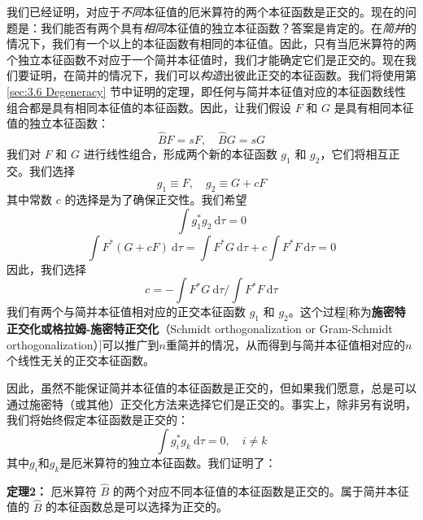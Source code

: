     我们已经证明，对应于\textit{不同}本征值的厄米算符的两个本征函数是正交的。现在的问题是：我们能否有两个具有\textit{相同}本征值的独立本征函数？答案是肯定的。在\textit{简并}的情况下，我们有一个以上的本征函数有相同的本征值。因此，只有当厄米算符的两个独立本征函数不对应于一个简并本征值时，我们才能确定它们是正交的。现在我们要证明，在简并的情况下，我们可以\textit{构造}出彼此正交的本征函数。我们将使用第 \ref{sec:3.6 Degeneracy} 节中证明的定理，即任何与简并本征值对应的本征函数线性组合都是具有相同本征值的本征函数。因此，让我们假设 $F$ 和 $G$ 是具有相同本征值的独立本征函数：
    \begin{equation*}
        \hat{B}F = sF, \quad \hat{B}G = sG
    \end{equation*}
    我们对 $F$ 和 $G$ 进行线性组合，形成两个新的本征函数 $g_1$ 和 $g_2$，它们将相互正交。我们选择
    \begin{equation*}
        g_1 \equiv F, \quad g_2 \equiv G + cF
    \end{equation*}
    其中常数 $c$ 的选择是为了确保正交性。我们希望
    \begin{equation*}
        \int g_1^{\ast} g_2 \:\mathrm{d}\tau = 0
    \end{equation*}
    \begin{equation*}
        \int F^{\ast} \left(G + cF\right) \:\mathrm{d}\tau = \int F^{\ast} G \:\mathrm{d}\tau + c \int F^{\ast} F \:\mathrm{d}\tau = 0
    \end{equation*}
    因此，我们选择
    \begin{equation}
        c = -\int F^{\ast} G \:\mathrm{d}\tau \Big/ \int F^{\ast} F \:\mathrm{d}\tau
        \label{eq:7.23}
    \end{equation}
    我们有两个与简并本征值相对应的正交本征函数 $g_1$ 和 $g_2$。这个过程[称为\textbf{施密特正交化或格拉姆-施密特正交化}（Schmidt orthogonalization or Gram-Schmidt orthogonalization）]可以推广到$n$重简并的情况，从而得到与简并本征值相对应的$n$个线性无关的正交本征函数。

    因此，虽然不能保证简并本征值的本征函数是正交的，但如果我们愿意，总是可以通过施密特（或其他）正交化方法来选择它们是正交的。事实上，除非另有说明，我们将始终假定本征函数是正交的：
    \begin{equation}
        \int g_i^{\ast} g_k \:\mathrm{d}\tau = 0, \quad i \neq k
        \label{eq:7.24}
    \end{equation}
    其中$g_i$和$g_k$是厄米算符的独立本征函数。我们证明了：
    \begin{center}
        \parbox{0.8\textwidth}{
            \centering \textbf{定理2：} 厄米算符 $\hat{B}$ 的两个对应不同本征值的本征函数是正交的。属于简并本征值的 $\hat{B}$ 的本征函数总是可以选择为正交的。
        }
    \end{center}

